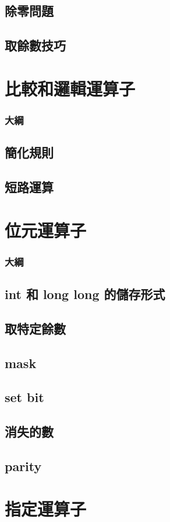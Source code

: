 \documentclass[utf8]{beamer}
\begin{document}
\begin{CJK}{UTF8}{bkai}
\subsection{除零問題}
\subsection{取餘數技巧}

\section{比較和邏輯運算子}
\begin{frame}
  \frametitle{大綱}
  \begin{multicols}{2}
    \tableofcontents[currentsection]
  \end{multicols}
\end{frame}

\subsection{簡化規則}

\subsection{短路運算}

\section{位元運算子}
\begin{frame}
  \frametitle{大綱}
  \begin{multicols}{2}
    \tableofcontents[currentsection]
  \end{multicols}
\end{frame}

\subsection{int 和 long long 的儲存形式}

\subsection{取特定餘數}

\subsection{mask}

\subsection{set bit}

\subsection{消失的數}

\subsection{parity}

\section{指定運算子}

\clearpage
\end{CJK}
\end{document}
